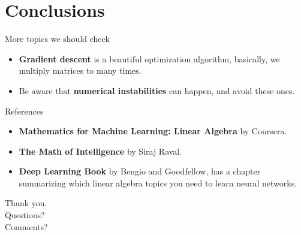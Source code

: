 \documentclass[handout]{beamer}
\begin{document}
\section{Conclusions}

\begin{frame}{More topics we should check}
    \begin{itemize}
        \item \textbf{Gradient descent} is a beautiful optimization algorithm,
                basically, we multiply matrices to many times.
        \item Be aware that \textbf{numerical instabilities} can happen, and avoid these ones.
    \end{itemize} 
\end{frame}

\begin{frame}{References}
    \begin{itemize}
        \item \textbf{Mathematics for Machine Learning: Linear Algebra} by Coursera.
        \item \textbf{The Math of Intelligence} by Siraj Raval.
        \item \textbf{Deep Learning Book} by Bengio and Goodfellow, has a chapter summarizing
            which linear algebra topics you need to learn neural networks.
    \end{itemize}
\end{frame}

\begin{frame}
\huge{Thank you.}\\
\huge{Questions?}\\
\huge{Comments?}\\
\end{frame}
\end{document}
